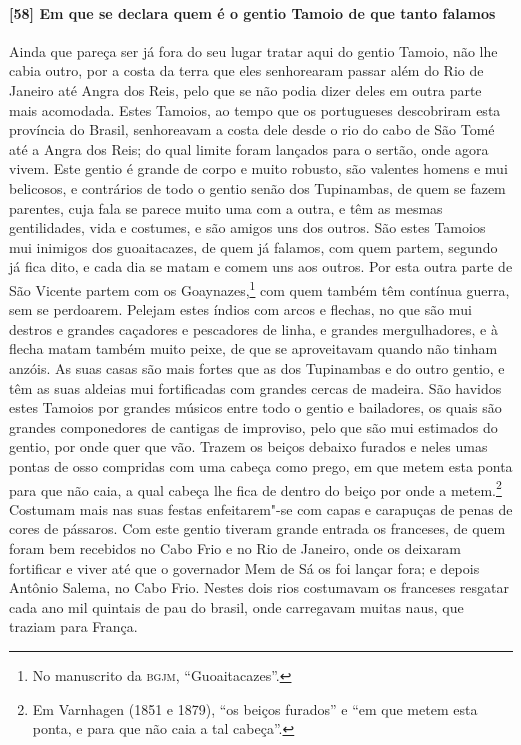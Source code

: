 \paragraph{[58] Em que se declara quem é o gentio Tamoio de que tanto falamos} \quad
Ainda que pareça ser já fora do seu lugar tratar aqui do gentio Tamoio, não lhe cabia
outro, por a costa da terra que eles senhorearam passar além do Rio de Janeiro até Angra
dos Reis, pelo que se não podia dizer deles em outra parte mais acomodada. Estes Tamoios,
ao tempo que os portugueses descobriram esta província do Brasil, senhoreavam a costa dele
desde o rio do cabo de São Tomé até a Angra dos Reis; do qual limite foram lançados para o
sertão, onde agora vivem. Este gentio é grande de corpo e muito robusto, são valentes
homens e mui belicosos, e contrários de todo o gentio senão dos Tupinambas, de quem se
fazem parentes, cuja fala se parece muito uma com a outra, e têm as mesmas gentilidades,
vida e costumes, e são amigos uns dos outros. São estes Tamoios mui inimigos dos
guoaitacazes, de quem já falamos, com quem partem, segundo já fica dito, e cada dia se
matam e comem uns aos outros. Por esta outra parte de São Vicente partem com os
Goaynazes,\footnote{ No manuscrito da \textsc{bgjm}, ``Guoaitacazes''.} com quem também
têm contínua guerra, sem se perdoarem. Pelejam estes índios com arcos e flechas, no que
são mui destros e grandes caçadores e pescadores de linha, e grandes mergulhadores, e à
flecha matam também muito peixe, de que se aproveitavam quando não tinham anzóis. As suas
casas são mais fortes que as dos Tupinambas e do outro gentio, e têm as suas aldeias mui
fortificadas com grandes cercas de madeira. São havidos estes Tamoios por grandes músicos
entre todo o gentio e bailadores, os quais são grandes componedores de cantigas de
improviso, pelo que são mui estimados do gentio, por onde quer que vão. Trazem os beiços
debaixo furados e neles umas pontas de osso compridas com uma cabeça como prego, em que
metem esta ponta para que não caia, a qual cabeça lhe fica de dentro do beiço por onde a
metem.\footnote{ Em Varnhagen (1851 e 1879), ``os beiços furados'' e ``em que metem esta
ponta, e para que não caia a tal cabeça''.} Costumam mais nas suas festas enfeitarem"-se
com capas e carapuças de penas de cores de pássaros. Com este gentio tiveram grande
entrada os franceses, de quem foram bem recebidos no Cabo Frio e no Rio de Janeiro, onde
os deixaram fortificar e viver até que o governador Mem de Sá os foi lançar fora; e depois
Antônio Salema, no Cabo Frio. Nestes dois rios costumavam os franceses resgatar cada ano
mil quintais de pau do brasil, onde carregavam muitas naus, que traziam para França.

